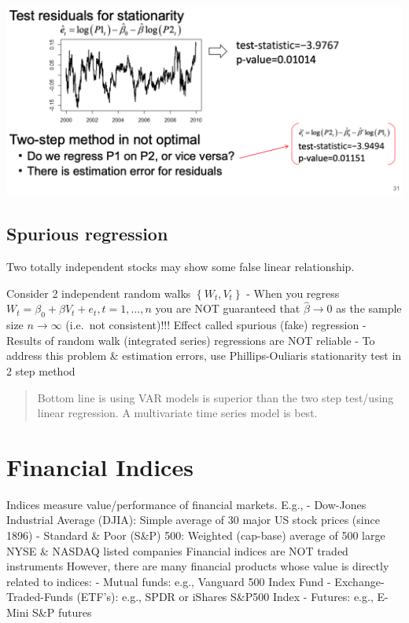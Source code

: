 \documentclass[
  oneside]{book}
\begin{document}
\includegraphics{Notes/Obsidian-Attachments/9-Statistical-Arbitrage-11.png}

\hypertarget{spurious-regression}{%
\subsection{Spurious regression}\label{spurious-regression}}

Two totally independent stocks may show some false linear relationship.

Consider 2 independent random walks \(\left\{W_t, V_t\right\}\)
- When you regress \(W_t=\beta_0+\beta V_t+e_t, t=1, \ldots, n\) you are NOT guaranteed that \(\hat{\beta} \rightarrow 0\) as the sample size \(n \rightarrow \infty\) (i.e.~not consistent)!!!
Effect called spurious (fake) regression
- Results of random walk (integrated series) regressions are NOT reliable
- To address this problem \& estimation errors, use Phillips-Ouliaris stationarity test in 2 step method

\begin{quote}
Bottom line is using VAR models is superior than the two step test/using linear regression. A multivariate time series model is best.
\end{quote}

\hypertarget{financial-indices}{%
\section{Financial Indices}\label{financial-indices}}

Indices measure value/performance of financial markets. E.g.,
- Dow-Jones Industrial Average (DJIA): Simple average of 30 major US stock prices (since 1896)
- Standard \& Poor (S\&P) 500: Weighted (cap-base) average of 500 large NYSE \& NASDAQ listed companies
Financial indices are NOT traded instruments
However, there are many financial products whose value is directly related to indices:
- Mutual funds: e.g., Vanguard 500 Index Fund
- Exchange-Traded-Funds (ETF's): e.g., SPDR or iShares S\&P500 Index
- Futures: e.g., E-Mini S\&P futures
\end{document}
